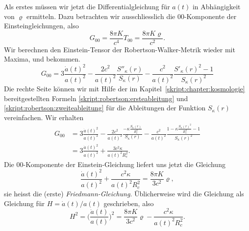 Als erstes müssen wir jetzt die Differentialgleichung für $a(t)$
in Abhängigkeit von $\varrho$ ermitteln.
Dazu betrachten wir ausschliesslich die $00$-Komponente der
Einsteingleichungen, also
\begin{equation}
G_{00} = \frac{8\pi K}{c^4} T_{00}=\frac{8\pi K\varrho}{c^2}.
\label{skript:friedmann:einstein}
\end{equation}
Wir berechnen den Einstein-Tensor der Robertson-Walker-Metrik
wieder mit Maxima, und bekommen.
\begin{equation}
G_{00}
=
3\frac{\dot a(t)^2}{a(t)^2}
-\frac{2c^2}{a(t)^2}\frac{S''_\kappa(r)}{S_\kappa(r)}
-\frac{c^2}{a(t)^2}
\frac{S'_\kappa(r)^2-1}{S_\kappa(r)^2}
\end{equation}
Die rechte Seite können wir mit Hilfe der im
Kapitel~\ref{skript:chapter:kosmologie} bereitgestellten Formeln
\eqref{skript:robertson:ersteableitung} und
\eqref{skript:robertson:zweiteableitung} für die Ableitungen der Funktion
$S_\kappa(r)$ vereinfachen.
Wir erhalten 
\begin{align*}
G_{00}
&=
3\frac{\dot a(t)^2}{a(t)^2}
-\frac{2c^2}{a(t)^2}\frac{-\kappa\displaystyle \frac{S_\kappa(r)}{R_c^2}}{S_\kappa(r)}
-\frac{c^2}{a(t)^2}
\frac{1-\kappa \frac{\displaystyle S_\kappa(r)^2}{R_c^2}-1}{S_\kappa(r)^2}
\\
&=
3\frac{\dot a(t)^2}{a(t)^2}
+\frac{3c^2\kappa}{a(t)^2R_c^2}.
\end{align*}
Die $00$-Komponente der Einstein-Gleichung liefert uns jetzt die Gleichung
\begin{equation}
\frac{\dot a(t)^2}{a(t)^2}
+
\frac{c^2\kappa}{a(t)^2R_c^2}
=
\frac{8\pi K}{3c^2}\varrho,
\end{equation}
sie heisst die (erste) {\em Friedmann-Gleichung}.
%
Üblicherweise wird die Gleichung als Gleichung für $H=\dot a(t)/a(t)$
geschrieben, also
\begin{equation}
H^2
=
\biggl(
\frac{\dot a(t)}{a(t)}
\biggr)^2
=
\frac{8\pi K}{3c^2}\varrho
-
\frac{c^2\kappa }{a(t)^2R_c^2}.
\label{skript:friedmann:friedmann}
\end{equation}


